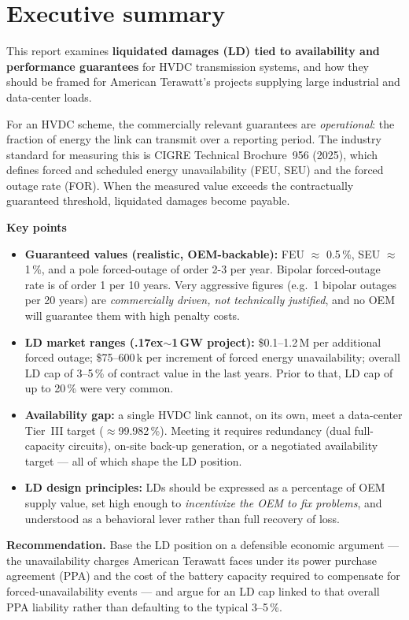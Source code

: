 \section{Executive summary}

This report examines \textbf{liquidated damages (LD) tied to availability and
performance guarantees} for HVDC transmission systems, and how they should be
framed for American Terawatt's projects supplying large industrial and
data-center loads.

For an HVDC scheme, the commercially relevant guarantees are \emph{operational}:
the fraction of energy the link can transmit over a reporting period. The
industry standard for measuring this is CIGRE Technical Brochure~956 (2025),
which defines forced and scheduled energy unavailability (FEU, SEU) and the
forced outage rate (FOR). When the measured value exceeds the contractually
guaranteed threshold, liquidated damages become payable.

\textbf{Key points}
\begin{itemize}
  \item \textbf{Guaranteed values (realistic, OEM-backable):} FEU $\approx$
        0.5\,\%, SEU $\approx$ 1\,\%, and a pole forced-outage of order 2-3 per year. 
        Bipolar forced-outage rate is of order 1 per 10 years. Very aggressive figures (e.g.\ 1 bipolar outages per 20 years) are
        \emph{commercially driven, not technically justified}, and no OEM will
        guarantee them with high penalty costs.
  \item \textbf{LD market ranges (\raise.17ex\hbox{$\scriptstyle\sim$}1\,GW project):}
        \$0.1--1.2\,M per additional forced outage; \$75--600\,k per increment
        of forced energy unavailability; overall LD cap of 3--5\,\% of contract
        value in the last years. Prior to that, LD cap of up to 20\,\% were very common.
  \item \textbf{Availability gap:} a single HVDC link cannot, on its own, meet a
        data-center Tier~III target ($\approx$99.982\,\%). Meeting it requires
        redundancy (dual full-capacity circuits), on-site back-up generation, or
        a negotiated availability target — all of which shape the LD position.
  \item \textbf{LD design principles:} LDs should be expressed as a percentage
        of OEM supply value, set high enough to \emph{incentivize the OEM to
        fix problems}, and understood as a behavioral lever rather than full
        recovery of loss.
\end{itemize}

\textbf{Recommendation.} Base the LD position on a defensible economic argument
--- the unavailability charges American Terawatt faces under its power purchase
agreement (PPA) and the cost of the battery capacity required to compensate for
forced-unavailability events --- and argue for an LD cap linked to that overall
PPA liability rather than defaulting to the typical 3--5\,\%.
